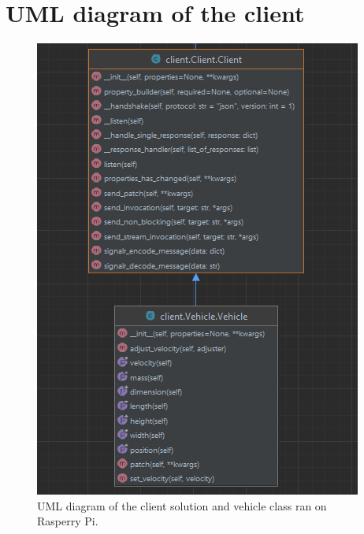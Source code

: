\section{UML diagram of the client}
\begin{figure}[h!]
	\centering
	\includegraphics[width=1\linewidth]{figures/client_diagram}
	\caption{UML diagram of the client solution and vehicle class ran on Rasperry Pi.}
	\label{fig:clientdiagram}
\end{figure}